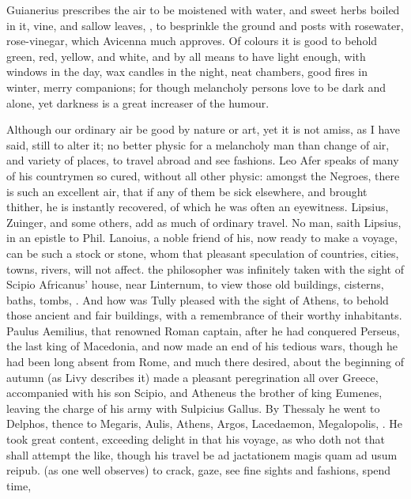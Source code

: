 {Guianerius prescribes the air to be moistened with water, and
sweet herbs boiled in it, vine, and sallow leaves, \etc{},  to
besprinkle the ground and posts with rosewater, rose-vinegar, which
Avicenna much approves. Of colours it is good to behold green, red,
yellow, and white, and by all means to have light enough, with windows
in the day, wax candles in the night, neat chambers, good fires in
winter, merry companions; for though melancholy persons love to be dark
and alone, yet darkness is a great increaser of the humour.

Although our ordinary air be good by nature or art, yet it is not
amiss, as I have said, still to alter it; no better physic for a
melancholy man than change of air, and variety of places, to travel
abroad and see fashions. Leo Afer speaks of many of his
countrymen so cured, without all other physic: amongst the Negroes,
there is such an excellent air, that if any of them be sick elsewhere,
and brought thither, he is instantly recovered, of which he was often
an eyewitness. Lipsius, Zuinger, and some others, add as much of
ordinary travel. No man, saith Lipsius, in an epistle to Phil. Lanoius,
a noble friend of his, now ready to make a voyage, can be such a
stock or stone, whom that pleasant speculation of countries, cities,
towns, rivers, will not affect.  \Seneca the philosopher was
infinitely taken with the sight of Scipio Africanus' house, near
Linternum, to view those old buildings, cisterns, baths, tombs, \etc{}. And
how was Tully pleased with the sight of Athens, to behold those
ancient and fair buildings, with a remembrance of their worthy
inhabitants. Paulus Aemilius, that renowned Roman captain, after he had
conquered Perseus, the last king of Macedonia, and now made an end of
his tedious wars, though he had been long absent from Rome, and much
there desired, about the beginning of autumn (as Livy describes
it) made a pleasant peregrination all over Greece, accompanied with his
son Scipio, and Atheneus the brother of king Eumenes, leaving the
charge of his army with Sulpicius Gallus. By Thessaly he went to
Delphos, thence to Megaris, Aulis, Athens, Argos, Lacedaemon,
Megalopolis, \etc{}. He took great content, exceeding delight in that his
voyage, as who doth not that shall attempt the like, though his travel
be ad jactationem magis quam ad usum reipub. (as one well
observes) to crack, gaze, see fine sights and fashions, spend time,
}
